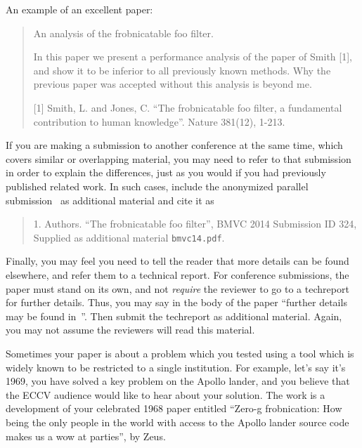 \documentclass[runningheads]{llncs}
\begin{document}
An example of an excellent paper:

\begin{quote}
\begin{center}
     An analysis of the frobnicatable foo filter.
\end{center}

   In this paper we present a performance analysis of the
   paper of Smith [1], and show it to be inferior to
   all previously known methods.  Why the previous paper
   was accepted without this analysis is beyond me.

   [1] Smith, L. and Jones, C. ``The frobnicatable foo
   filter, a fundamental contribution to human knowledge''.
   Nature 381(12), 1-213.
\end{quote}

If you are making a submission to another conference at the same
time, which covers similar or overlapping material, you may need
to refer to that submission in order to explain the differences,
just as you would if you had previously published related work. In
such cases, include the anonymized parallel
submission~\cite{Authors14} as additional material and cite it as
\begin{quote}
1. Authors. ``The frobnicatable foo filter'', BMVC 2014 Submission
ID 324, Supplied as additional material {\tt bmvc14.pdf}.
\end{quote}

Finally, you may feel you need to tell the reader that more
details can be found elsewhere, and refer them to a technical
report.  For conference submissions, the paper must stand on its
own, and not {\em require} the reviewer to go to a techreport for
further details.  Thus, you may say in the body of the paper
``further details may be found in~\cite{Authors14b}''.  Then
submit the techreport as additional material. Again, you may not
assume the reviewers will read this material.

Sometimes your paper is about a problem which you tested using a tool which
is widely known to be restricted to a single institution.  For example,
let's say it's 1969, you have solved a key problem on the Apollo lander,
and you believe that the ECCV audience would like to hear about your
solution.  The work is a development of your celebrated 1968 paper entitled
``Zero-g frobnication: How being the only people in the world with access to
the Apollo lander source code makes us a wow at parties'', by Zeus.
\end{document}
